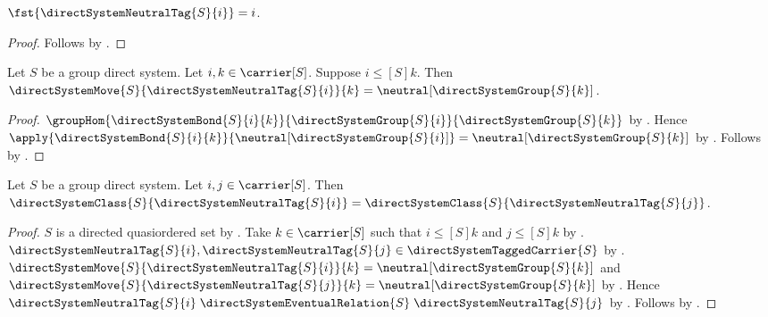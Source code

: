 \begin{proposition}\label{direct_system_neutral_tag_first}
    $\fst{\directSystemNeutralTag{S}{i}}=i$.
\end{proposition}
\begin{proof}
    Follows by .
\end{proof}

\begin{lemma}\label{direct_system_neutral_tag_moves}
    Let $S$ be a group direct system.
    Let $i,k\in\carrier[S]$.
    Suppose $i\mathrel{\leq[S]}k$.
    Then $\directSystemMove{S}{\directSystemNeutralTag{S}{i}}{k}
        =\neutral[\directSystemGroup{S}{k}]$.
\end{lemma}
\begin{proof}
    $\groupHom
        {\directSystemBond{S}{i}{k}}
        {\directSystemGroup{S}{i}}
        {\directSystemGroup{S}{k}}$ by
        .
    Hence $\apply{\directSystemBond{S}{i}{k}}
        {\neutral[\directSystemGroup{S}{i}]}
        =\neutral[\directSystemGroup{S}{k}]$ by
        .
    Follows by
        .
\end{proof}

\begin{lemma}\label{direct_system_neutral_class_independent}
    Let $S$ be a group direct system.
    Let $i,j\in\carrier[S]$.
    Then $\directSystemClass{S}{\directSystemNeutralTag{S}{i}}
        =\directSystemClass{S}{\directSystemNeutralTag{S}{j}}$.
\end{lemma}
\begin{proof}
    $S$ is a directed quasiordered set by
        .
    Take $k\in\carrier[S]$ such that
        $i\mathrel{\leq[S]}k$ and $j\mathrel{\leq[S]}k$ by
        .
    $\directSystemNeutralTag{S}{i},\directSystemNeutralTag{S}{j}\in
        \directSystemTaggedCarrier{S}$ by
        .
    $\directSystemMove{S}{\directSystemNeutralTag{S}{i}}{k}
        =\neutral[\directSystemGroup{S}{k}]$ and
        $\directSystemMove{S}{\directSystemNeutralTag{S}{j}}{k}
        =\neutral[\directSystemGroup{S}{k}]$ by
        .
    Hence $\directSystemNeutralTag{S}{i}
        \mathrel{\directSystemEventualRelation{S}}
        \directSystemNeutralTag{S}{j}$ by
        .
    Follows by .
\end{proof}

